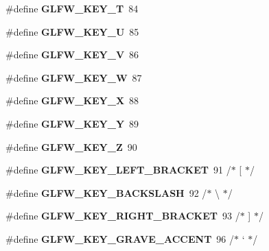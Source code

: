 \begin{DoxyCompactItemize}
\#define {\bfseries G\+L\+F\+W\+\_\+\+K\+E\+Y\+\_\+T}~84
\item 
\mbox{\label{group__keys_gacad52f3bf7d378fc0ffa72a76769256d}} 
\#define {\bfseries G\+L\+F\+W\+\_\+\+K\+E\+Y\+\_\+U}~85
\item 
\mbox{\label{group__keys_ga22c7763899ecf7788862e5f90eacce6b}} 
\#define {\bfseries G\+L\+F\+W\+\_\+\+K\+E\+Y\+\_\+V}~86
\item 
\mbox{\label{group__keys_gaa06a712e6202661fc03da5bdb7b6e545}} 
\#define {\bfseries G\+L\+F\+W\+\_\+\+K\+E\+Y\+\_\+W}~87
\item 
\mbox{\label{group__keys_gac1c42c0bf4192cea713c55598b06b744}} 
\#define {\bfseries G\+L\+F\+W\+\_\+\+K\+E\+Y\+\_\+X}~88
\item 
\mbox{\label{group__keys_gafd9f115a549effdf8e372a787c360313}} 
\#define {\bfseries G\+L\+F\+W\+\_\+\+K\+E\+Y\+\_\+Y}~89
\item 
\mbox{\label{group__keys_gac489e208c26afda8d4938ed88718760a}} 
\#define {\bfseries G\+L\+F\+W\+\_\+\+K\+E\+Y\+\_\+Z}~90
\item 
\mbox{\label{group__keys_gad1c8d9adac53925276ecb1d592511d8a}} 
\#define {\bfseries G\+L\+F\+W\+\_\+\+K\+E\+Y\+\_\+\+L\+E\+F\+T\+\_\+\+B\+R\+A\+C\+K\+ET}~91  /$\ast$ \mbox{[} $\ast$/
\item 
\mbox{\label{group__keys_gab8155ea99d1ab27ff56f24f8dc73f8d1}} 
\#define {\bfseries G\+L\+F\+W\+\_\+\+K\+E\+Y\+\_\+\+B\+A\+C\+K\+S\+L\+A\+SH}~92  /$\ast$ \textbackslash{} $\ast$/
\item 
\mbox{\label{group__keys_ga86ef225fd6a66404caae71044cdd58d8}} 
\#define {\bfseries G\+L\+F\+W\+\_\+\+K\+E\+Y\+\_\+\+R\+I\+G\+H\+T\+\_\+\+B\+R\+A\+C\+K\+ET}~93  /$\ast$ \mbox{]} $\ast$/
\item 
\mbox{\label{group__keys_ga7a3701fb4e2a0b136ff4b568c3c8d668}} 
\#define {\bfseries G\+L\+F\+W\+\_\+\+K\+E\+Y\+\_\+\+G\+R\+A\+V\+E\+\_\+\+A\+C\+C\+E\+NT}~96  /$\ast$ ` $\ast$/
\item 

\end{DoxyCompactItemize}
